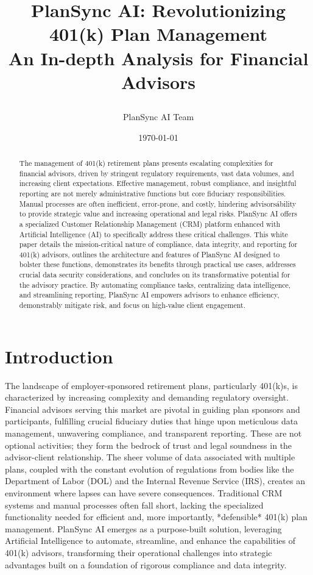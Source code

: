 \documentclass[11pt]{article} %
\title{
    \plansynclogo[0.4\textwidth]
    \vspace{1cm}
    
    PlanSync AI: Revolutionizing 401(k) Plan Management \\ 
    \large An In-depth Analysis for Financial Advisors
}
\author{PlanSync AI Team}
\date{\today}
\begin{document}
\maketitle

\begin{abstract}
\noindent The management of 401(k) retirement plans presents escalating complexities for financial advisors, driven by stringent regulatory requirements, vast data volumes, and increasing client expectations. Effective management, robust compliance, and insightful reporting are not merely administrative functions but core fiduciary responsibilities. Manual processes are often inefficient, error-prone, and costly, hindering advisors\' ability to provide strategic value and increasing operational and legal risks. PlanSync AI offers a specialized Customer Relationship Management (CRM) platform enhanced with Artificial Intelligence (AI) to specifically address these critical challenges. This white paper details the mission-critical nature of compliance, data integrity, and reporting for 401(k) advisors, outlines the architecture and features of PlanSync AI designed to bolster these functions, demonstrates its benefits through practical use cases, addresses crucial data security considerations, and concludes on its transformative potential for the advisory practice. By automating compliance tasks, centralizing data intelligence, and streamlining reporting, PlanSync AI empowers advisors to enhance efficiency, demonstrably mitigate risk, and focus on high-value client engagement.
\end{abstract}

\section{Introduction}
The landscape of employer-sponsored retirement plans, particularly 401(k)s, is characterized by increasing complexity and demanding regulatory oversight. Financial advisors serving this market are pivotal in guiding plan sponsors and participants, fulfilling crucial fiduciary duties that hinge upon meticulous data management, unwavering compliance, and transparent reporting. These are not optional activities; they form the bedrock of trust and legal soundness in the advisor-client relationship. The sheer volume of data associated with multiple plans, coupled with the constant evolution of regulations from bodies like the Department of Labor (DOL) and the Internal Revenue Service (IRS), creates an environment where lapses can have severe consequences. Traditional CRM systems and manual processes often fall short, lacking the specialized functionality needed for efficient and, more importantly, *defensible* 401(k) plan management. PlanSync AI emerges as a purpose-built solution, leveraging Artificial Intelligence to automate, streamline, and enhance the capabilities of 401(k) advisors, transforming their operational challenges into strategic advantages built on a foundation of rigorous compliance and data integrity.
\end{document}
